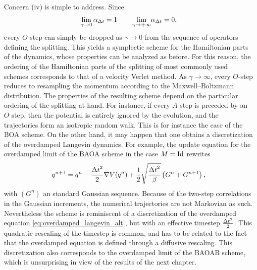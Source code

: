      \begin{remark}
        Concern (iv) is simple to address. Since
        \[\underset{\gamma \to 0}{\lim}\,\alpha_{\Delta t}=1\,\qquad \underset{\gamma \to +\infty}{\lim}\alpha_{\Delta t}=0,\]
        every $O$-step can simply be dropped as $\gamma\to 0$ from the sequence of operators defining the splitting. 
        This yields a symplectic scheme for the Hamiltonian parts of the dynamics, whose properties can be analyzed as before.
        For this reason, the ordering of the Hamiltonian parts of the splitting of most commonly used schemes corresponds to that of a velocity Verlet method.
         As $\gamma \to \infty$, 
        every $O$-step reduces to resampling the momentum according to the Maxwell--Boltzmann distribution. 
        The properties of the resulting scheme depend on the particular ordering of the splitting at hand. 
        For instance, if every $A$ step is preceded by an $O$ step, then the potential is entirely ignored by the evolution, and the trajectories form an isotropic random walk. This is for instance the case of the BOA scheme.
        On the other hand, it may happen that one obtains a discretization of the overdamped Langevin dynamics. For example, the update equation for the overdamped limit of the BAOA scheme in the case $M=\mathrm{Id}$ rewrites
        \[q^{n+1}=q^n -\frac{{\Delta t}^2}2\nabla V(q^n)+\frac12\sqrt{\frac{{\Delta t}^2}\beta}\left(G^n+G^{n+1}\right),\]
        with $(G^n)$ an \iid standard Gaussian sequence. Because of the two-step correlations in the Gaussian increments, the numerical trajectories are not Markovian as such.
        Nevertheless the scheme is reminiscent of a discretization of the overdamped equation \eqref{eq:overdamped_langevin_alt}, but with an effective timestep $\frac{{\Delta t}^2}2$. 
        This quadratic rescaling of the timestep is common, and has to be related to the fact that the overdamped equation is defined through a diffusive rescaling.
        This discretization also corresponds to the overdamped limit of the BAOAB scheme, which is unsurprising in view of the results of the next chapter.
     \end{remark}

